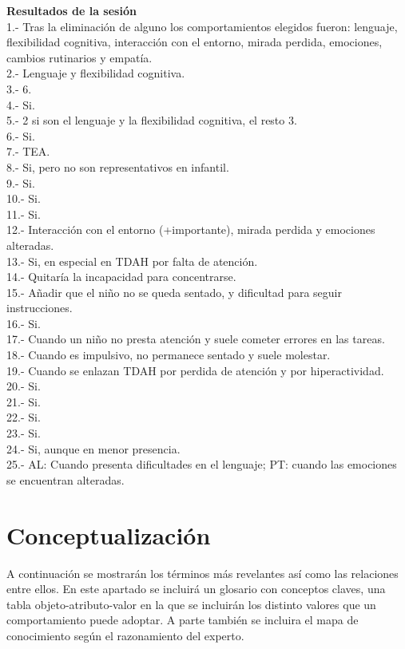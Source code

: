 \documentclass[letterpaper,12pt]{article}
\begin{document}
\textbf{Resultados de la sesión} \\
1.- Tras la eliminación de alguno los comportamientos elegidos fueron: lenguaje, flexibilidad cognitiva, interacción con el entorno, mirada perdida, emociones, cambios rutinarios y empatía.\\
2.- Lenguaje y flexibilidad cognitiva.\\
3.- 6. \\
4.- Si. \\
5.- 2 si son el lenguaje y la flexibilidad cognitiva, el resto 3. \\
6.- Si. \\
7.- TEA. \\
8.- Si, pero no son representativos en infantil. \\
9.- Si. \\
10.- Si. \\
11.- Si. \\
12.- Interacción con el entorno (+importante), mirada perdida y emociones alteradas. \\
13.- Si, en especial en TDAH por falta de atención. \\
14.- Quitaría la incapacidad para concentrarse. \\
15.- Añadir que el niño no se queda sentado, y dificultad para seguir instrucciones. \\
16.- Si. \\
17.- Cuando un niño no presta atención y suele cometer errores en las tareas. \\
18.- Cuando es impulsivo, no permanece sentado y suele molestar. \\
19.- Cuando se enlazan TDAH por perdida de atención y por hiperactividad. \\
20.- Si. \\
21.- Si. \\
22.- Si. \\
23.- Si. \\
24.- Si, aunque en menor presencia. \\
25.- AL: Cuando presenta dificultades en el lenguaje; PT: cuando las emociones se encuentran alteradas. \\
\newpage
\section{Conceptualización}
A continuación se mostrarán los términos más revelantes así como las
relaciones entre ellos. En este apartado se incluirá un glosario con conceptos claves, una tabla objeto-atributo-valor en la que se incluirán los distinto valores que un comportamiento puede adoptar. A parte también se incluira el mapa de conocimiento según el razonamiento del experto.
\end{document}
